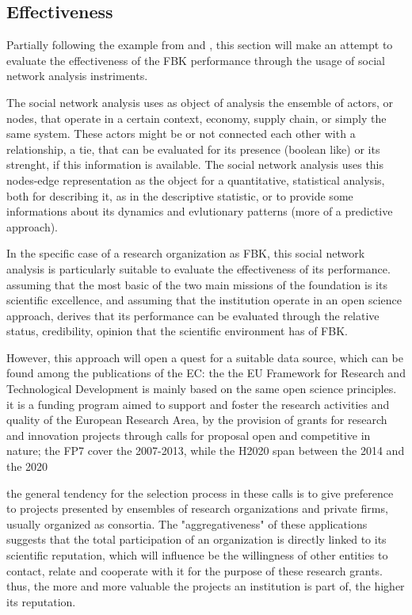 \subsection{Effectiveness}

Partially following the example from \citet{Giuliani2005} and \citet{Cantner2006}, this section will make an attempt to evaluate the effectiveness of the FBK performance through the usage of social network analysis instriments. 

The social network analysis uses as object of analysis the ensemble of actors, or nodes, that operate in a certain context, economy, supply chain, or simply the same system. These actors might be or not connected each other with a relationship, a tie, that can be evaluated for its presence (boolean like) or its strenght, if this information is available. The social network analysis uses this nodes-edge representation as the object for a quantitative, statistical analysis, both for describing it, as in the descriptive statistic, or to provide some informations about its dynamics and evlutionary patterns (more of a predictive approach).

In the specific case of a research organization as FBK, this social network analysis is particularly suitable to evaluate the effectiveness of its performance. assuming that the most basic of the two main missions of the foundation is its scientific excellence, and assuming that the institution operate in an open science approach, derives that its performance can be evaluated through the relative status, credibility, opinion that the scientific environment has of FBK.

However, this approach will open a quest for a suitable data source, which can be found among the publications of the EC: the the EU Framework for Research and Technological Development is mainly based on the same open science principles. it is a funding program aimed to support and foster the research activities and quality of the European Research Area, by the provision of grants for research and innovation projects through calls for proposal open and competitive in nature; the FP7 cover the 2007-2013, while the H2020 span between the 2014 and the 2020

the general tendency for the selection process in these calls is to give preference to projects presented by ensembles of research organizations and private firms, usually organized as consortia. The "aggregativeness" of these applications suggests that the total participation of an organization is directly linked to its scientific reputation, which will influence be the willingness of other entities to contact, relate and cooperate with it for the purpose of these research grants. thus, the more and more valuable the projects an institution is part of, the higher its reputation.

